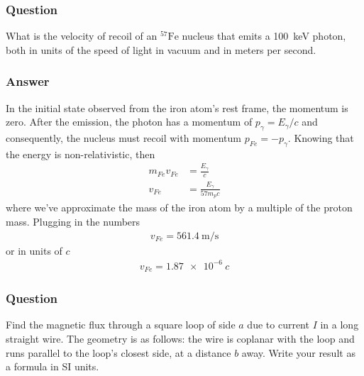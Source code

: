 \subsubsection{Question}

What is the velocity of recoil of an ${}^{57}\mathrm{Fe}$ nucleus that emits
a \SI{100}{\keV} photon, both in units of the speed of light in vacuum and in
meters per second.

\subsubsection{Answer}

In the initial state observed from the iron atom's rest frame, the momentum
is zero. After the emission, the photon has a momentum of $p_γ = E_γ/c$ and
consequently, the nucleus must recoil with momentum $p_{Fe} = -p_γ$. Knowing
that the energy is non-relativistic, then
\begin{align*}
    m_{Fe}v_{Fe} &= \frac{E_γ}{c} \\
    v_{Fe} &= \frac{E_γ}{57m_p c}
\end{align*}
where we've approximate the mass of the iron atom by a multiple of the proton
mass. Plugging in the numbers
\begin{align}
    \boxed{ v_{Fe} = \SI{561.4}{\m\per\s} }
\end{align}
or in units of $c$
\begin{align}
    \boxed{ v_{Fe} = \SI{1.87e-6}{c} }
\end{align}

\subsubsection{Question}

Find the magnetic flux through a square loop of side $a$ due to current $I$ in
a long straight wire. The geometry is as follows: the wire is coplanar with the
loop and runs parallel to the loop's closest side, at a distance $b$ away.
Write your result as a formula in SI units.

